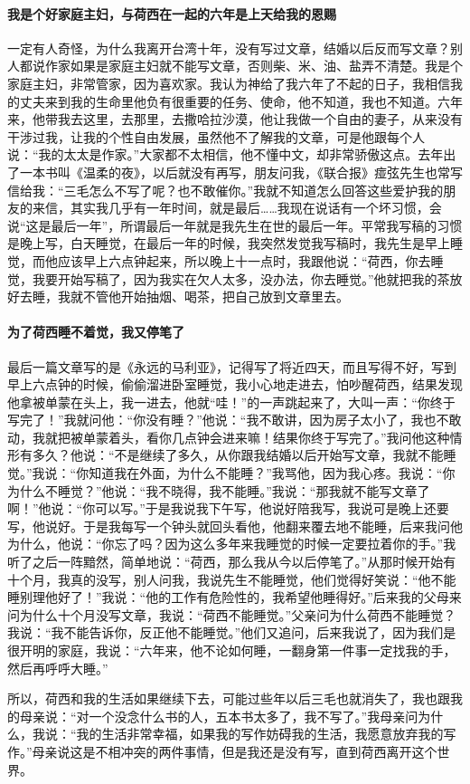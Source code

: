 \paragraph*{我是个好家庭主妇，与荷西在一起的六年是上天给我的恩赐}
\par 一定有人奇怪，为什么我离开台湾十年，没有写过文章，结婚以后反而写文章？别人都说作家如果是家庭主妇就不能写文章，否则柴、米、油、盐弄不清楚。我是个家庭主妇，非常管家，因为喜欢家。我认为神给了我六年了不起的日子，我相信我的丈夫来到我的生命里他负有很重要的任务、使命，他不知道，我也不知道。六年来，他带我去这里，去那里，去撒哈拉沙漠，他让我做一个自由的妻子，从来没有干涉过我，让我的个性自由发展，虽然他不了解我的文章，可是他跟每个人说：“我的太太是作家。”大家都不太相信，他不懂中文，却非常骄傲这点。去年出了一本书叫《温柔的夜》，以后就没有再写，朋友问我，《联合报》痖弦先生也常写信给我：“三毛怎么不写了呢？也不敢催你。”我就不知道怎么回答这些爱护我的朋友的来信，其实我几乎有一年时间，就是最后……我现在说话有一个坏习惯，会说“这是最后一年”，所谓最后一年就是我先生在世的最后一年。平常我写稿的习惯是晚上写，白天睡觉，在最后一年的时候，我突然发觉我写稿时，我先生是早上睡觉，而他应该早上六点钟起来，所以晚上十一点时，我跟他说：“荷西，你去睡觉，我要开始写稿了，因为我实在欠人太多，没办法，你去睡觉。”他就把我的茶放好去睡，我就不管他开始抽烟、喝茶，把自己放到文章里去。

\paragraph*{为了荷西睡不着觉，我又停笔了}
\par 最后一篇文章写的是《永远的马利亚》，记得写了将近四天，而且写得不好，写到早上六点钟的时候，偷偷溜进卧室睡觉，我小心地走进去，怕吵醒荷西，结果发现他拿被单蒙在头上，我一进去，他就“哇！”的一声跳起来了，大叫一声：“你终于写完了！”我就问他：“你没有睡？”他说：“我不敢讲，因为房子太小了，我也不敢动，我就把被单蒙着头，看你几点钟会进来嘛！结果你终于写完了。”我问他这种情形有多久？他说：“不是继续了多久，从你跟我结婚以后开始写文章，我就不能睡觉。”我说：“你知道我在外面，为什么不能睡？”我骂他，因为我心疼。我说：“你为什么不睡觉？”他说：“我不晓得，我不能睡。”我说：“那我就不能写文章了啊！”他说：“你可以写。”于是我说我下午写，他说好陪我写，我说可是晚上还要写，他说好。于是我每写一个钟头就回头看他，他翻来覆去地不能睡，后来我问他为什么，他说：“你忘了吗？因为这么多年来我睡觉的时候一定要拉着你的手。”我听了之后一阵黯然，简单地说：“荷西，那么我从今以后停笔了。”从那时候开始有十个月，我真的没写，别人问我，我说先生不能睡觉，他们觉得好笑说：“他不能睡别理他好了！”我说：“他的工作有危险性的，我希望他睡得好。”后来我的父母来问为什么十个月没写文章，我说：“荷西不能睡觉。”父亲问为什么荷西不能睡觉？我说：“我不能告诉你，反正他不能睡觉。”他们又追问，后来我说了，因为我们是很开明的家庭，我说：“六年来，他不论如何睡，一翻身第一件事一定找我的手，然后再呼呼大睡。”
\par 所以，荷西和我的生活如果继续下去，可能过些年以后三毛也就消失了，我也跟我的母亲说：“对一个没念什么书的人，五本书太多了，我不写了。”我母亲问为什么，我说：“我的生活非常幸福，如果我的写作妨碍我的生活，我愿意放弃我的写作。”母亲说这是不相冲突的两件事情，但是我还是没有写，直到荷西离开这个世界。

